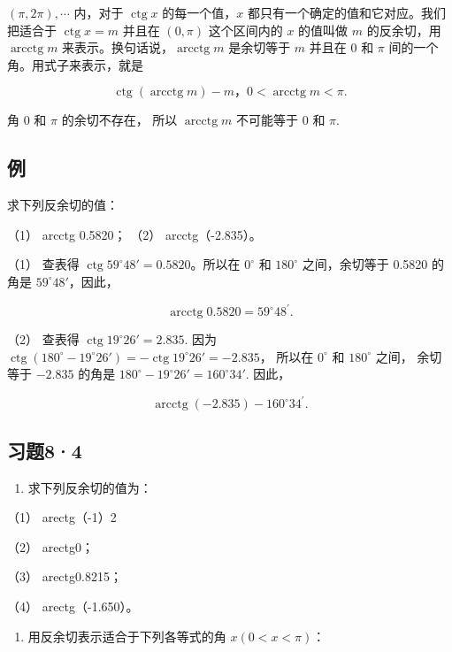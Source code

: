 \((\pi, 2\pi), \cdots\) 内，对于 \(\operatorname{ctg} x\)
的每一个值，\(x\) 都只有一个确定的值和它对应。我们把适合于
\(\operatorname{ctg} x = m\) 并且在 \((0, \pi)\) 这个区间内的 \(x\)
的值叫做 \(m\) 的反余切，用 \(\operatorname{arcctg} m\)
来表示。换句话说，\(\operatorname{arcctg} m\) 是余切等于 \(m\) 并且在
\(0\) 和 \(\pi\) 间的一个角。用式子来表示，就是

\[
\boxed {\operatorname{ctg} (\operatorname{arcctg}m) - m\text{，} 0 <   \operatorname{arcctg}m <   \pi .}
\]

 角 0 和 \(\pi\) 的余切不存在， 所以
\(\operatorname{arcctg}m\) 不可能等于 0 和 \(\pi\).

\subsection{例}

求下列反余切的值：

（1） arcctg 0.5820； （2） arcctg（-2.835）。

 （1） 查表得
\(\operatorname{ctg} 59^{\circ}48' = 0.5820\)。所以在 \(0^{\circ}\) 和
\(180^{\circ}\) 之间，余切等于 0.5820 的角是 \(59^{\circ}48'\)，因此，

\[
\operatorname{arcctg} 0.5820 = 59 ^{\circ} 48 ^{\prime}.
\]

（2） 查表得 \(\operatorname{ctg} 19^{\circ} 26' = 2.835\). 因为
\(\operatorname{ctg}(180^{\circ} - 19^{\circ} 26') = -\operatorname{ctg} 19^{\circ} 26' = -2.835\)，
所以在 \(0^{\circ}\) 和 \(180^{\circ}\) 之间， 余切等于 \(-2.835\)
的角是 \(180^{\circ} - 19^{\circ} 26' = 160^{\circ} 34'\). 因此，

\[
\operatorname{arcctg} (- 2.835) - 160 ^{\circ} 34 ^{\prime}.
\]

\subsection{习题8·4}

\begin{enumerate}
\item
  求下列反余切的值为：
\end{enumerate}

（1） arectg（-1）2

（2） arectg0；

（3） arectg0.8215；

（4） arectg（-1.650）。

\begin{enumerate}[start=2]
\item
  用反余切表示适合于下列各等式的角 \(x(0 < x < \pi)\)：
\end{enumerate}

